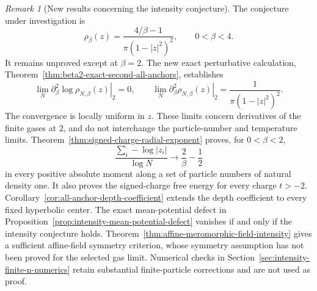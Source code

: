\documentclass[11pt,a4paper]{article}
\numberwithin{equation}{section}
\theoremstyle{definition}
\theoremstyle{remark}
\newtheorem{remark}[theorem]{Remark}
\begin{document}
\begin{remark}[New results concerning the intensity conjecture]
The conjecture under investigation is
\[
 \rho_\beta(z)=\frac{4/\beta-1}{\pi(1-|z|^2)^2},\qquad 0<\beta<4.
\]
It remains unproved except at $\beta=2$. The new exact perturbative
calculation, Theorem~\ref{thm:beta2-exact-second-all-anchors}, establishes
\[
 \lim_N\left.\partial_\beta^2\log\rho_{N,\beta}(z)\right|_2=0,
 \qquad
 \lim_N\left.\partial_\beta^2\rho_{N,\beta}(z)\right|_2
       =\frac1{\pi(1-|z|^2)^2}.
\]
The convergence is locally uniform in $z$. These limits concern
derivatives of the finite gases at $2$, and do not
interchange the particle-number and temperature limits.
Theorem~\ref{thm:signed-charge-radial-exponent} proves, for $0<\beta<2$,
\[
 \frac{\sum_i-\log|z_i|}{\log N}\longrightarrow\frac2\beta-\frac12
\]
in every positive absolute moment along a set of particle numbers of
natural density one. It also proves the signed-charge free energy for
every charge $t>-2$. Corollary~\ref{cor:all-anchor-depth-coefficient}
extends the depth coefficient to every fixed hyperbolic center.
The exact mean-potential defect in
Proposition~\ref{prop:intensity-mean-potential-defect} vanishes if and
only if the intensity conjecture holds. Theorem~\ref{thm:affine-meromorphic-field-intensity}
gives a sufficient affine-field symmetry criterion, whose symmetry
assumption has not been proved for the selected gas limit. Numerical
checks in Section~\ref{sec:intensity-finite-n-numerics} retain substantial
finite-particle corrections and are not used as proof.
\end{remark}
\end{document}
